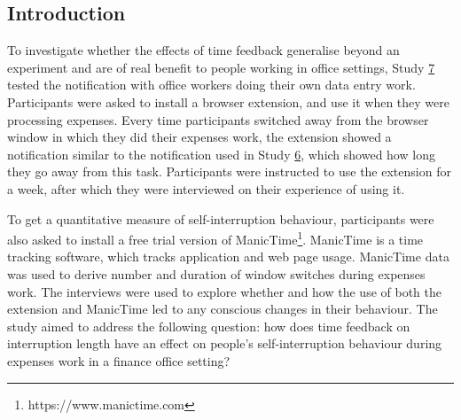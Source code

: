 \subsection{Introduction}
To investigate whether the effects of time feedback generalise beyond an experiment and are of real benefit to people working in office settings, Study \hyperref[st:Study7]{7} tested the notification with office workers doing their own data entry work. %
Participants were asked to install a browser extension, and use it when they were processing expenses. Every time participants switched away from the browser window in which they did their expenses work, the extension showed a notification similar to the notification used in Study \hyperref[st:Study6]{6}, which showed how long they go away from this task. Participants were instructed to use the extension for a week, after which they were interviewed on their experience of using it. %

To get a quantitative measure of self-interruption behaviour, participants were also asked to install a free trial version of ManicTime\footnote{https://www.manictime.com}. ManicTime is a time tracking software, which tracks application and web page usage. ManicTime data was used to derive number and duration of window switches during expenses work. The interviews were used to explore whether and how the use of both the extension and ManicTime led to any conscious changes in their behaviour. The study aimed to address the following question: how does time feedback on interruption length have an effect on people's self-interruption behaviour during expenses work in a finance office setting? 

